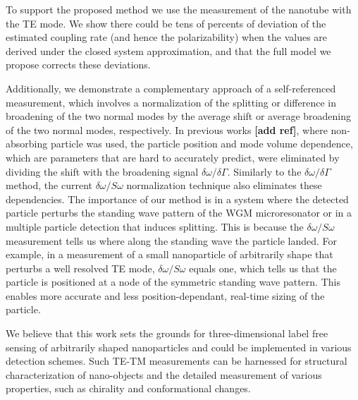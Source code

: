 \documentclass[journal=jacsat,manuscript=article]{achemso}
\begin{document}
To support the proposed method we use the measurement of the nanotube with the TE mode. We show there could be tens of percents of deviation of the estimated coupling rate (and hence the polarizability) when the values are derived under the closed system approximation, and that the full model we propose corrects these deviations.

Additionally, we demonstrate a complementary approach of a self-referenced measurement, which involves a normalization of the splitting or difference in broadening of the two normal modes by the average shift or average broadening of the two normal modes, respectively. In previous works \textbf{[add ref]}, where non-absorbing particle was used, the particle position and mode volume dependence, which are parameters that are hard to accurately predict, were eliminated by dividing the shift with the broadening signal $\delta \omega / \delta \Gamma$. Similarly to the $\delta \omega / \delta \Gamma$ method, the current $\delta \omega / \textit{S} \omega$ normalization technique also eliminates these dependencies. The importance of our method is in a system where the detected particle perturbs the standing wave pattern of the WGM microresonator or in a multiple particle detection that induces splitting. This is because the $\delta \omega / \textit{S} \omega$ measurement tells us where along the standing wave the particle landed. For example, in a measurement of a small nanoparticle of arbitrarily shape that perturbs a well resolved TE mode, $\delta \omega / \textit{S} \omega$ equals one, which tells us that the particle is positioned at a node of the symmetric standing wave pattern. This enables more accurate and less position-dependant, real-time sizing of the particle.

We believe that this work sets the grounds for three-dimensional label free sensing of arbitrarily shaped nanoparticles and could be implemented in various detection schemes. Such TE-TM measurements can be harnessed for structural characterization of nano-objects and the detailed measurement of various properties, such as chirality and conformational changes.

\begin{acknowledgement}



\end{acknowledgement}
\end{document}
